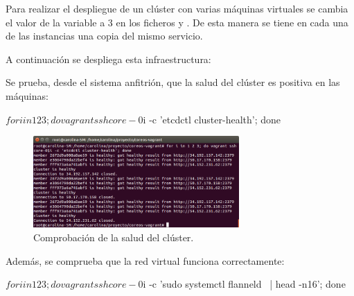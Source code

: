 Para realizar el despliegue de un clúster con varias máquinas virtuales se cambia el valor de la variable  a 3 en los ficheros  y . De esta manera se tiene en cada una de las instancias una copia del mismo servicio.

A continuación se despliega esta infraestructura:


Se prueba, desde el sistema anfitrión, que la salud del clúster es positiva en las máquinas:

\begin{code}
$ for i in 1 2 3; do vagrant ssh core-0$i -c 'etcdctl cluster-health'; done
\end{code}

\begin{figure}[H]
\centering
\includegraphics[width=0.7\textwidth]{images/figures/cluster-health-aws-3.png}
\caption{Comprobación de la salud del clúster.}
\end{figure}

Además, se comprueba que la red virtual funciona correctamente:

\begin{code}
$ for i in 1 2 3; do vagrant ssh core-0$i -c 'sudo systemctl flanneld \
  | head -n16'; done
\end{code}

